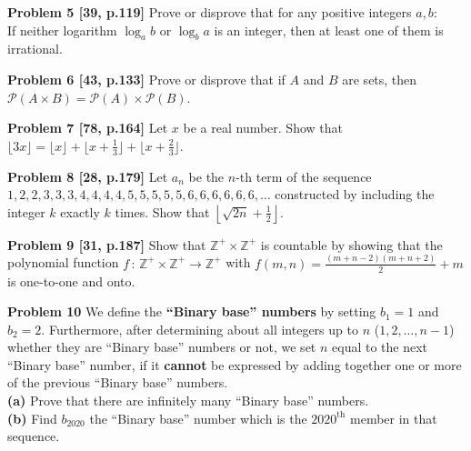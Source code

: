\documentclass[jou]{apa6}
\begin{document}
\vspace{2ex}
{\bf Problem 5 [39, p.119]} 
Prove or disprove that for any positive integers $a,b$:\\
If neither logarithm $\log_a b$ or $\log_b a$ is an integer, 
then at least one of them is irrational. 

\vspace{2ex}
{\bf Problem 6 [43, p.133]}
Prove or disprove that if $A$ and $B$ are sets, then 
$\mathcal{P}(A \times B) = \mathcal{P}(A) \times \mathcal{P}(B)$.

\vspace{2ex}
{\bf Problem 7 [78, p.164]}
Let $x$ be a real number. Show that 
$\lfloor 3x \rfloor = \lfloor x \rfloor + \lfloor x + \frac{1}{3} \rfloor +
\lfloor x + \frac{2}{3} \rfloor$.

\vspace{2ex}
{\bf Problem 8 [28, p.179]}
Let $a_n$ be the $n$-th term of the sequence $1, 2,2, 3,3,3, 4,4,4,4, 5,5,5,5,5, 6,6,6,6,6,6,\ldots$
constructed by including the integer $k$ exactly $k$ times. Show that 
${\displaystyle \left\lfloor \sqrt{2n} + \frac{1}{2} \right\rfloor}$. 


\vspace{2ex}
{\bf Problem 9 [31, p.187]}
Show that $\mathbb{Z}^{+} \times \mathbb{Z}^{+}$ is countable by showing that
the polynomial function $f\,:\,\mathbb{Z}^{+} \times \mathbb{Z}^{+} \rightarrow \mathbb{Z}^{+}$
with ${\displaystyle f(m,n) = \frac{(m+n-2)(m+n+2)}{2} + m}$ is one-to-one and onto.

\vspace{2ex}
{\bf Problem 10}
We define the {\bf ``Binary base'' numbers} 
by setting $b_1 = 1$ and $b_2 = 2$. 
Furthermore, after determining about all integers up 
to $n$ ($1,2,\ldots,n-1$) whether they are ``Binary base'' 
numbers or not, we set $n$ equal to the next ``Binary base'' 
number, if it {\bf cannot} be expressed by adding together
one or more of the previous ``Binary base'' numbers.\\
{\bf (a)} Prove that there are infinitely many ``Binary base'' 
numbers.\\
{\bf (b)} Find $b_{2020}$ \textendash the ``Binary base'' 
number which is the $2020^{\mbox{th}}$ member in that sequence. 
\end{document}
